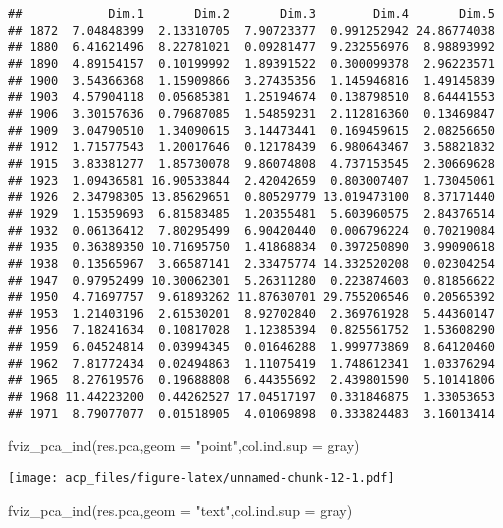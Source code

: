 \documentclass[
]{article}
\newenvironment{Shaded}{\begin{snugshade}}{\end{snugshade}}
\newcommand{\AttributeTok}[1]{\textcolor[rgb]{0.77,0.63,0.00}{#1}}
\newcommand{\FunctionTok}[1]{\textcolor[rgb]{0.00,0.00,0.00}{#1}}
\newcommand{\NormalTok}[1]{#1}
\newcommand{\StringTok}[1]{\textcolor[rgb]{0.31,0.60,0.02}{#1}}
\begin{document}
\begin{verbatim}
##            Dim.1       Dim.2       Dim.3        Dim.4       Dim.5
## 1872  7.04848399  2.13310705  7.90723377  0.991252942 24.86774038
## 1880  6.41621496  8.22781021  0.09281477  9.232556976  8.98893992
## 1890  4.89154157  0.10199992  1.89391522  0.300099378  2.96223571
## 1900  3.54366368  1.15909866  3.27435356  1.145946816  1.49145839
## 1903  4.57904118  0.05685381  1.25194674  0.138798510  8.64441553
## 1906  3.30157636  0.79687085  1.54859231  2.112816360  0.13469847
## 1909  3.04790510  1.34090615  3.14473441  0.169459615  2.08256650
## 1912  1.71577543  1.20017646  0.12178439  6.980643467  3.58821832
## 1915  3.83381277  1.85730078  9.86074808  4.737153545  2.30669628
## 1923  1.09436581 16.90533844  2.42042659  0.803007407  1.73045061
## 1926  2.34798305 13.85629651  0.80529779 13.019473100  8.37171440
## 1929  1.15359693  6.81583485  1.20355481  5.603960575  2.84376514
## 1932  0.06136412  7.80295499  6.90420440  0.006796224  0.70219084
## 1935  0.36389350 10.71695750  1.41868834  0.397250890  3.99090618
## 1938  0.13565967  3.66587141  2.33475774 14.332520208  0.02304254
## 1947  0.97952499 10.30062301  5.26311280  0.223874603  0.81856622
## 1950  4.71697757  9.61893262 11.87630701 29.755206546  0.20565392
## 1953  1.21403196  2.61530201  8.92702840  2.369761928  5.44360147
## 1956  7.18241634  0.10817028  1.12385394  0.825561752  1.53608290
## 1959  6.04524814  0.03994345  0.01646288  1.999773869  8.64120460
## 1962  7.81772434  0.02494863  1.11075419  1.748612341  1.03376294
## 1965  8.27619576  0.19688808  6.44355692  2.439801590  5.10141806
## 1968 11.44223200  0.44262527 17.04517197  0.331846875  1.33053653
## 1971  8.79077077  0.01518905  4.01069898  0.333824483  3.16013414
\end{verbatim}

\begin{Shaded}
\begin{Highlighting}[]
\FunctionTok{fviz\_pca\_ind}\NormalTok{(res.pca,}\AttributeTok{geom =} \StringTok{"point"}\NormalTok{,}\AttributeTok{col.ind.sup =} \StringTok{\textquotesingle{}gray\textquotesingle{}}\NormalTok{)}
\end{Highlighting}
\end{Shaded}

\texttt{[image: acp\_files/figure-latex/unnamed-chunk-12-1.pdf]}

\begin{Shaded}
\begin{Highlighting}[]
\FunctionTok{fviz\_pca\_ind}\NormalTok{(res.pca,}\AttributeTok{geom =} \StringTok{"text"}\NormalTok{,}\AttributeTok{col.ind.sup =} \StringTok{\textquotesingle{}gray\textquotesingle{}}\NormalTok{)}
\end{Highlighting}
\end{Shaded}
\end{document}
